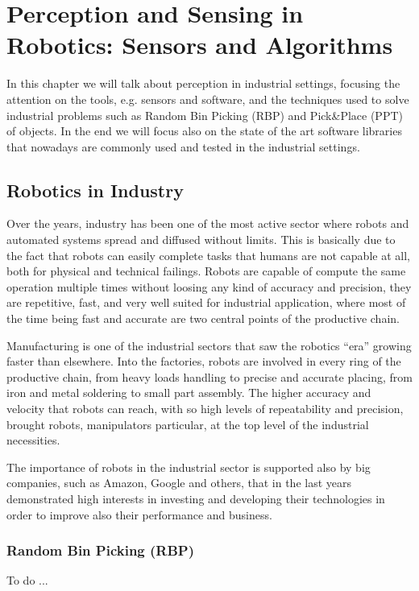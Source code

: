 \chapter{Perception and Sensing in Robotics: Sensors and Algorithms}\label{ch:perceptionandsensing}
In this chapter we will talk about perception in industrial settings, focusing the attention on the tools, e.g. sensors and software, and the techniques used to solve industrial problems such as Random Bin Picking (RBP) and Pick\&Place (PPT) of objects. In the end we will focus also on the state of the art software libraries that nowadays are commonly used and tested in the industrial settings.

\section{Robotics in Industry}\label{sec:roboticsinindustry}
Over the years, industry has been one of the most active sector where robots and automated systems spread and diffused without limits. This is basically due to the fact that robots can easily complete tasks that humans are not capable at all, both for physical and technical failings. Robots are capable of compute the same operation multiple times without loosing any kind of accuracy and precision, they are repetitive, fast, and very well suited for industrial application, where most of the time being fast and accurate are two central points of the productive chain.

Manufacturing is one of the industrial sectors that saw the robotics ``era'' growing faster than elsewhere. Into the factories, robots are involved in every ring of the productive chain, from heavy loads handling to precise and accurate placing, from iron and metal soldering to small part assembly. The higher accuracy and velocity that robots can reach, with so high levels of repeatability and precision, brought robots, manipulators particular, at the top level of the industrial necessities.

The importance of robots in the industrial sector is supported also by big companies, such as Amazon, Google and others, that in the last years demonstrated high interests in investing and developing their technologies in order to improve also their performance and business.

\subsection{Random Bin Picking (RBP)}\label{subsec:binpicking}
To do ...

